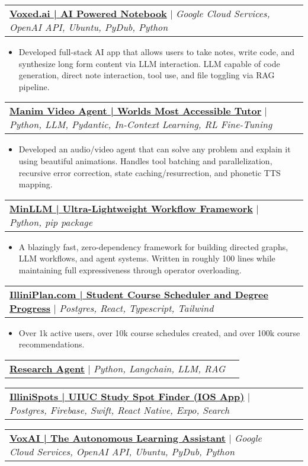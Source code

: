 \documentclass[letterpaper,10.99999999999999pt]{article}
\makeatletter
\newcommand{\resumeItem}[1]{
  \item\small{
    {#1 \vspace{-1pt}}
  }
}
\newcommand{\resumeProjectHeading}[2]{
    \item
    \begin{tabular*}{0.97\textwidth}{l@{\extracolsep{\fill}}r}
      \small#1 & #2 \\
    \end{tabular*}\vspace{-6pt}
}
\newcommand{\resumeItemListStart}{\begin{itemize}}
\newcommand{\resumeItemListEnd}{\end{itemize}\vspace{-5pt}}
\makeatother
\begin{document}
      \resumeProjectHeading
        {\textbf{\href{https://www.aidanandrews.info/projects/voxed}{Voxed.ai | AI Powered Notebook}} $|$ \emph{Google Cloud Services, OpenAI API, Ubuntu, PyDub, Python}}{}
        \resumeItemListStart
          \resumeItem{Developed full-stack AI app that allows users to take notes, write code, and synthesize long form content via LLM interaction. LLM capable of code generation, direct note interaction, tool use, and file toggling via RAG pipeline.}
        \resumeItemListEnd
        
      \resumeProjectHeading
        {\textbf{\href{https://github.com/aidanandrews22/manim-video-agent}{Manim Video Agent | Worlds Most Accessible Tutor}} $|$ \emph{Python, LLM, Pydantic, In-Context Learning, RL Fine-Tuning}}{}
        \resumeItemListStart
          \resumeItem{Developed an audio/video agent that can solve any problem and explain it using beautiful animations. Handles tool batching and parallelization, recursive error correction, state caching/resurrection, and phonetic TTS mapping.}
        \resumeItemListEnd

      \resumeProjectHeading
        {\textbf{\href{https://www.aidanandrews.info/projects/minllm}{MinLLM | Ultra-Lightweight Workflow Framework}} $|$ \emph{Python, pip package}}{}
        \resumeItemListStart
          \resumeItem{A blazingly fast, zero-dependency framework for building directed graphs, LLM workflows, and agent systems. Written in roughly 100 lines while maintaining full expressiveness through operator overloading.}
        \resumeItemListEnd

      \resumeProjectHeading
        {\textbf{\href{https://www.aidanandrews.info/projects/illini-plan}{IlliniPlan.com | Student Course Scheduler and Degree Progress}} $|$ \emph{Postgres, React, Typescript, Tailwind}}{}
        \resumeItemListStart
        \resumeItem{Over 1k active users, over 10k course schedules created, and over 100k course recommendations.}
        \resumeItemListEnd
        
      \resumeProjectHeading
        {\textbf{\href{https://github.com/aidanandrews22/Research-Agent}{Research Agent}} $|$ \emph{Python, Langchain, LLM, RAG}}{}
      
      \resumeProjectHeading
        {\textbf{\href{https://www.aidanandrews.info/projects/illini-spots}{IlliniSpots | UIUC Study Spot Finder (IOS App)}} $|$ \emph{Postgres, Firebase, Swift, React Native, Expo, Search}}{}  
        
      \resumeProjectHeading
        {\textbf{\href{https://www.aidanandrews.info/projects/voxai}{VoxAI | The Autonomous Learning Assistant}} $|$ \emph{Google Cloud Services, OpenAI API, Ubuntu, PyDub, Python}}{}
            
\end{document}

